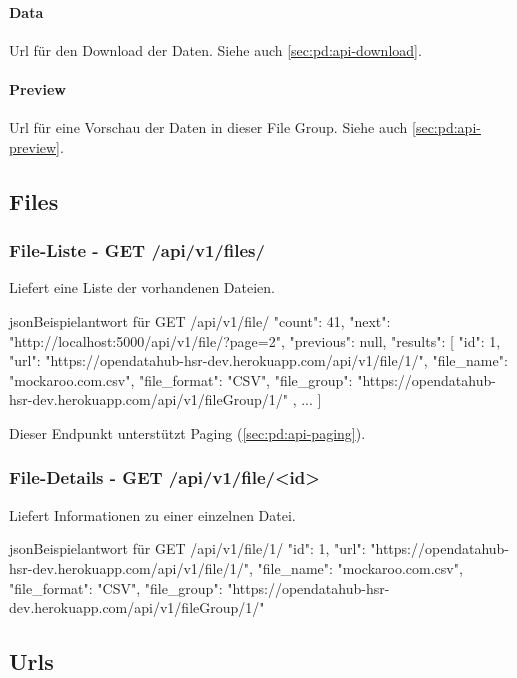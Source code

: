 \paragraph{Data} Url für den Download der Daten. Siehe auch \cref{sec:pd:api-download}.
\paragraph{Preview} Url für eine Vorschau der Daten in dieser File Group. Siehe auch \cref{sec:pd:api-preview}.

\subsection{Files} \label{sec:pd:api-files}
\subsubsection{File-Liste - GET /api/v1/files/}
Liefert eine Liste der vorhandenen Dateien.

\begin{srclst}{json}{Beispielantwort für GET /api/v1/file/}
{
    "count": 41, 
    "next": "http://localhost:5000/api/v1/file/?page=2", 
    "previous": null, 
    "results": [
        {
          "id": 1, 
          "url": "https://opendatahub-hsr-dev.herokuapp.com/api/v1/file/1/", 
          "file_name": "mockaroo.com.csv", 
          "file_format": "CSV", 
          "file_group": "https://opendatahub-hsr-dev.herokuapp.com/api/v1/fileGroup/1/"
        }, 
        ...
    ]
}
\end{srclst}

Dieser Endpunkt unterstützt Paging (\cref{sec:pd:api-paging}).

\subsubsection{File-Details - GET /api/v1/file/<id>}
Liefert Informationen zu einer einzelnen Datei.

\begin{srclst}{json}{Beispielantwort für GET /api/v1/file/1/}
{
    "id": 1, 
    "url": "https://opendatahub-hsr-dev.herokuapp.com/api/v1/file/1/", 
    "file_name": "mockaroo.com.csv", 
    "file_format": "CSV", 
    "file_group": "https://opendatahub-hsr-dev.herokuapp.com/api/v1/fileGroup/1/"
}
\end{srclst}

\subsection{Urls} \label{sec:pd:api-urls}
